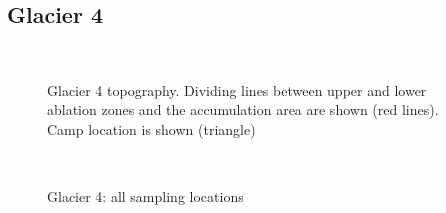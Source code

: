 \documentclass{sfuthesis}
\begin{document}
{\begin{appendices}
\section*{Glacier 4}
	\begin{figure}[H]
	\centering
	\\
\caption[]{Glacier 4 topography. Dividing lines between upper and lower ablation zones and the accumulation area are shown (red lines). Camp location is shown (triangle) }
\end{figure}
	\begin{figure}[H]
	\centering
	\\
\caption[]{Glacier 4: all sampling locations}
\end{figure}

\end{appendices}}
\end{document}
